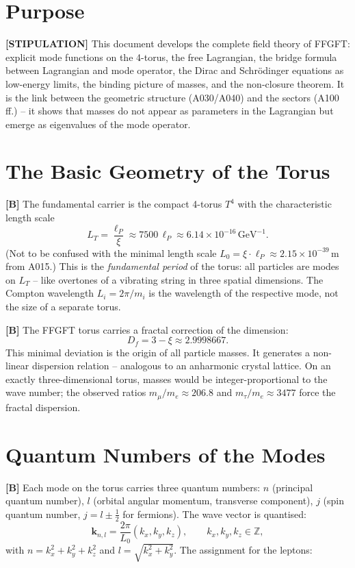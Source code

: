 \section{Purpose}

\textbf{[STIPULATION]} This document develops the complete field theory of FFGFT:
explicit mode functions on the 4-torus, the free Lagrangian, the bridge formula
between Lagrangian and mode operator, the Dirac and Schrödinger equations as
low-energy limits, the binding picture of masses, and the non-closure theorem.
It is the link between the geometric structure (A030/A040) and the sectors
(A100\,ff.) -- it shows that masses do not appear as parameters in the Lagrangian
but emerge as eigenvalues of the mode operator.

\section{The Basic Geometry of the Torus}

\textbf{[B]} The fundamental carrier is the compact 4-torus $T^4$ with the
characteristic length scale
\[
  L_T = \frac{\ell_P}{\xi}\approx7500\,\ell_P\approx6{.}14\times10^{-16}\,\text{GeV}^{-1}.
\]
(Not to be confused with the minimal length scale $L_0=\xi\cdot\ell_P\approx2{.}15\times10^{-39}\,$m
from A015.) This is the \emph{fundamental period} of the torus: all particles
are modes on $L_T$ -- like overtones of a vibrating string in three spatial
dimensions. The Compton wavelength $L_i=2\pi/m_i$ is the wavelength of the
respective mode, not the size of a separate torus.

\textbf{[B]} The FFGFT torus carries a fractal correction of the dimension:
\[
  D_f = 3-\xi\approx 2{.}9998667.
\]
This minimal deviation is the origin of all particle masses. It generates a
non-linear dispersion relation -- analogous to an anharmonic crystal lattice.
On an exactly three-dimensional torus, masses would be integer-proportional to
the wave number; the observed ratios $m_\mu/m_e\approx206{.}8$ and
$m_\tau/m_e\approx3477$ force the fractal dispersion.

\section{Quantum Numbers of the Modes}

\textbf{[B]} Each mode on the torus carries three quantum numbers: $n$ (principal
quantum number), $l$ (orbital angular momentum, transverse component), $j$ (spin
quantum number, $j=l\pm\tfrac12$ for fermions). The wave vector is quantised:
\[
  \mathbf k_{n,l} = \frac{2\pi}{L_0}(k_x,k_y,k_z),\qquad k_x,k_y,k_z\in\mathbb Z,
\]
with $n=k_x^2+k_y^2+k_z^2$ and $l=\sqrt{k_x^2+k_y^2}$. The assignment for
the leptons:


